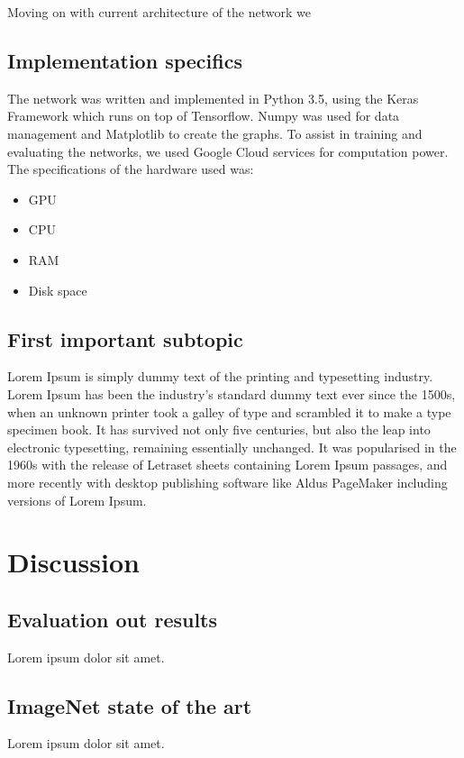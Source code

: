 \documentclass{kthreport}
\begin{document}
Moving on with current architecture of the network we

\subsection{Implementation specifics}

The network was written and implemented in Python 3.5, using the Keras Framework which runs on top of Tensorflow. Numpy was used for data management and Matplotlib to create the graphs. To assist in training and evaluating the networks, we used Google Cloud services for computation power. The specifications of the hardware used was:
\begin{itemize}
\item GPU
\item CPU
\item RAM
\item Disk space
\end{itemize}


\subsection{First important subtopic}

Lorem Ipsum is simply dummy text of the printing and typesetting industry. Lorem Ipsum has been the industry's standard dummy text ever since the 1500s, when an unknown printer took a galley of type and scrambled it to make a type specimen book. It has survived not only five centuries, but also the leap into electronic typesetting, remaining essentially unchanged. It was popularised in the 1960s with the release of Letraset sheets containing Lorem Ipsum passages, and more recently with desktop publishing software like Aldus PageMaker including versions of Lorem Ipsum.



\section{Discussion}

\subsection{Evaluation out results}

Lorem ipsum dolor sit amet.

\subsection{ImageNet state of the art}

Lorem ipsum dolor sit amet.



{}

\end{document}
